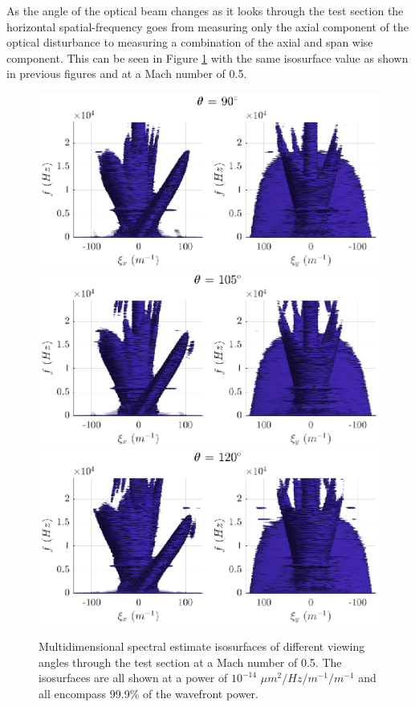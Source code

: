 As the angle of the optical beam changes as it looks through the test section the horizontal spatial-frequency goes from measuring only the axial component of the optical disturbance to measuring a combination of the axial and span wise component.
This can be seen in Figure \ref{fig:04_dispersion_angle} with the same isosurface value as shown in previous figures and at a Mach number of 0.5.
\begin{figure}
  \centering
  \includegraphics{../matlab/04_dispersion_analysis/dispersion_angle_90.eps}
  \includegraphics{../matlab/04_dispersion_analysis/dispersion_angle_105.eps}
  \includegraphics{../matlab/04_dispersion_analysis/dispersion_angle_120.eps}
  \caption{Multidimensional spectral estimate isosurfaces of different viewing angles through the test section at a Mach number of 0.5. The isosurfaces are all shown at a power of $10^{-14}$ $\mu m^2/Hz/m^{-1}/m^{-1}$ and all encompass 99.9\% of the wavefront power.}
  \label{fig:04_dispersion_angle}
\end{figure}
